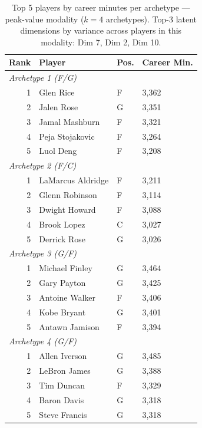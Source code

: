 \begin{table}[htbp]
  \centering\small
  \begin{tabular}{rlll}
    \toprule
    Rank & Player & Pos. & Career Min. \\
    \midrule
    \multicolumn{4}{l}{\textit{Archetype 1 (F/G)}} \\
    \midrule
    1 & Glen Rice & F & 3,362 \\
    2 & Jalen Rose & G & 3,351 \\
    3 & Jamal Mashburn & F & 3,321 \\
    4 & Peja Stojakovic & F & 3,264 \\
    5 & Luol Deng & F & 3,208 \\
    \midrule[0.4pt]
    \multicolumn{4}{l}{\textit{Archetype 2 (F/C)}} \\
    \midrule
    1 & LaMarcus Aldridge & F & 3,211 \\
    2 & Glenn Robinson & F & 3,114 \\
    3 & Dwight Howard & F & 3,088 \\
    4 & Brook Lopez & C & 3,027 \\
    5 & Derrick Rose & G & 3,026 \\
    \midrule[0.4pt]
    \multicolumn{4}{l}{\textit{Archetype 3 (G/F)}} \\
    \midrule
    1 & Michael Finley & G & 3,464 \\
    2 & Gary Payton & G & 3,425 \\
    3 & Antoine Walker & F & 3,406 \\
    4 & Kobe Bryant & G & 3,401 \\
    5 & Antawn Jamison & F & 3,394 \\
    \midrule[0.4pt]
    \multicolumn{4}{l}{\textit{Archetype 4 (G/F)}} \\
    \midrule
    1 & Allen Iverson & G & 3,485 \\
    2 & LeBron James & G & 3,388 \\
    3 & Tim Duncan & F & 3,329 \\
    4 & Baron Davis & G & 3,318 \\
    5 & Steve Francis & G & 3,318 \\
    \bottomrule
  \end{tabular}
  \caption{Top 5 players by career minutes per archetype --- peak-value modality ($k=4$ archetypes). Top-3 latent dimensions by variance across players in this modality: Dim 7, Dim 2, Dim 10.}
  \label{tab:arch_reps_peak_value}
\end{table}

